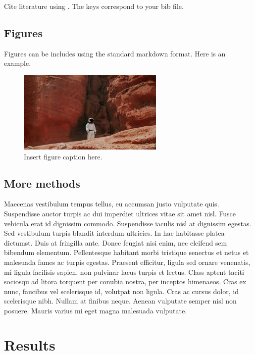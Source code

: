 Cite literature using \cite{tikhonov1977}. The keys correspond to your
bib file.

\hypertarget{figures}{%
\subsection{Figures}\label{figures}}

Figures can be includes using the standard markdown format. Here is an
example.

\begin{figure}
\centering
\includegraphics{figures/mars.jpg}
\caption{Insert figure caption here.}
\end{figure}

\hypertarget{more-methods}{%
\subsection{More methods}\label{more-methods}}

Maecenas vestibulum tempus tellus, eu accumsan justo vulputate quis.
Suspendisse auctor turpis ac dui imperdiet ultrices vitae sit amet nisl.
Fusce vehicula erat id dignissim commodo. Suspendisse iaculis nisl at
dignissim egestas. Sed vestibulum turpis blandit interdum ultricies. In
hac habitasse platea dictumst. Duis at fringilla ante. Donec feugiat
nisi enim, nec eleifend sem bibendum elementum. Pellentesque habitant
morbi tristique senectus et netus et malesuada fames ac turpis egestas.
Praesent efficitur, ligula sed ornare venenatis, mi ligula facilisis
sapien, non pulvinar lacus turpis et lectus. Class aptent taciti
sociosqu ad litora torquent per conubia nostra, per inceptos himenaeos.
Cras ex nunc, faucibus vel scelerisque id, volutpat non ligula. Cras ac
cursus dolor, id scelerisque nibh. Nullam at finibus neque. Aenean
vulputate semper nisl non posuere. Mauris varius mi eget magna malesuada
vulputate.

\hypertarget{results}{%
\section{Results}\label{results}}

